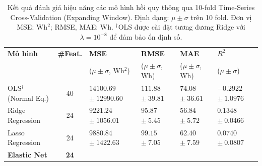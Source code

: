 \begin{table}[H]
\centering
\caption{Kết quả đánh giá hiệu năng các mô hình hồi quy thông qua 
         10-fold Time-Series Cross-Validation (Expanding Window). 
         Định dạng: $\mu \pm \sigma$ trên 10 fold. 
         Đơn vị MSE: Wh$^2$; RMSE, MAE: Wh.
         $^\dagger$OLS được cài đặt tương đương Ridge với 
         $\lambda = 10^{-8}$ để đảm bảo ổn định số.}
\label{tab:cv_results}
\renewcommand{\arraystretch}{1.6}
\setlength{\tabcolsep}{8pt}
\begin{tabular}{l c M M M M}
    \toprule
    \textbf{Mô hình} 
        & \textbf{\#Feat.} 
        & \textbf{MSE} 
        & \textbf{RMSE} 
        & \textbf{MAE} 
        & \textbf{$R^2$} \\
    & 
        & \small{($\mu \pm \sigma$, Wh$^2$)}
        & \small{($\mu \pm \sigma$, Wh)}
        & \small{($\mu \pm \sigma$, Wh)}
        & \small{($\mu \pm \sigma$)} \\
    \midrule
    OLS$^\dagger$ (Normal Eq.)     
        & 40  
        & $14100.69$ \newline $\pm\ 12990.60$
        & $111.88$ \newline $\pm\ 39.81$
        & $74.08$ \newline $\pm\ 36.61$
        & $-0.2922$ \newline $\pm\ 1.0976$ \\
    \midrule
    Ridge Regression           
        & 24  
        & $9221.24$ \newline $\pm\ 1056.01$
        & $95.87$ \newline $\pm\ 5.45$
        & $56.84$ \newline $\pm\ 5.72$
        & $0.1348$ \newline $\pm\ 0.0466$ \\
    \midrule
    Lasso Regression           
        & 24  
        & $9880.84$ \newline $\pm\ 1422.63$
        & $99.15$ \newline $\pm\ 7.05$
        & $62.40$ \newline $\pm\ 7.59$
        & $0.0740$ \newline $\pm\ 0.0807$ \\
    \midrule
    \textbf{Elastic Net}       
        & \textbf{24}  

\end{tabular}
\end{table}
